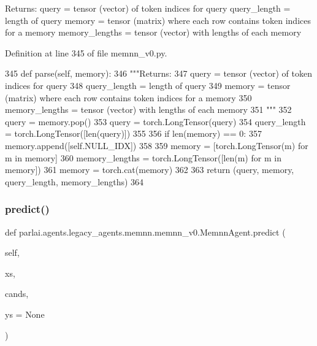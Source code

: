 \begin{DoxyVerb}Returns:
    query = tensor (vector) of token indices for query
    query_length = length of query
    memory = tensor (matrix) where each row contains token indices for a memory
    memory_lengths = tensor (vector) with lengths of each memory
\end{DoxyVerb}
 

Definition at line 345 of file memnn\+\_\+v0.\+py.


\begin{DoxyCode}
345     \textcolor{keyword}{def }parse(self, memory):
346         \textcolor{stringliteral}{"""Returns:}
347 \textcolor{stringliteral}{            query = tensor (vector) of token indices for query}
348 \textcolor{stringliteral}{            query\_length = length of query}
349 \textcolor{stringliteral}{            memory = tensor (matrix) where each row contains token indices for a memory}
350 \textcolor{stringliteral}{            memory\_lengths = tensor (vector) with lengths of each memory}
351 \textcolor{stringliteral}{        """}
352         query = memory.pop()
353         query = torch.LongTensor(query)
354         query\_length = torch.LongTensor([len(query)])
355 
356         \textcolor{keywordflow}{if} len(memory) == 0:
357             memory.append([self.NULL\_IDX])
358 
359         memory = [torch.LongTensor(m) \textcolor{keywordflow}{for} m \textcolor{keywordflow}{in} memory]
360         memory\_lengths = torch.LongTensor([len(m) \textcolor{keywordflow}{for} m \textcolor{keywordflow}{in} memory])
361         memory = torch.cat(memory)
362 
363         \textcolor{keywordflow}{return} (query, memory, query\_length, memory\_lengths)
364 
\end{DoxyCode}
\mbox{\label{classparlai_1_1agents_1_1legacy__agents_1_1memnn_1_1memnn__v0_1_1MemnnAgent_a4e850d51ca01adc45754cc509c8b096a}} 
\subsubsection{\texorpdfstring{predict()}{predict()}}
{\footnotesize\ttfamily def parlai.\+agents.\+legacy\+\_\+agents.\+memnn.\+memnn\+\_\+v0.\+Memnn\+Agent.\+predict (\begin{DoxyParamCaption}\item[{}]{self,  }\item[{}]{xs,  }\item[{}]{cands,  }\item[{}]{ys = {\ttfamily None} }\end{DoxyParamCaption})}



